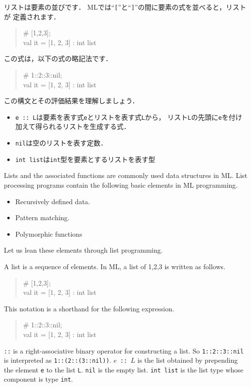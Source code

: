 \documentclass{jbook}
\begin{document}
リストは要素の並びです．
	MLでは``{\tt [}''と``{\tt ]}''の間に要素の式を並べると，リストが
定義されます．
\begin{tt}
\begin{quote}
\# [1,2,3];\\
val it = [1, 2, 3] : int list
\end{quote}
\end{tt}
	この式は，以下の式の略記法です．
\begin{tt}
\begin{quote}
\# 1::2::3::nil;\\
val it = [1, 2, 3] : int list
\end{quote}
\end{tt}
	この構文とその評価結果を理解しましょう．
\begin{itemize}
\item 
 {\tt e :: L}は要素を表す式{\tt e}とリストを表す式{\tt L}から，
リスト{\tt L}の先頭に{\tt e}を付け加えて得られるリストを生成する式．
\item 
{\tt nil}は空のリストを表す定数．
\item 
{\tt int list}は{\tt int}型を要素とするリストを表す型
\end{itemize}
\else%
	Lists and the associated functions are commonly used data
structures in ML.
	List processing programs contain the following basic elements in
ML programming.
\begin{itemize}
\item 
	Recursively defined data.
\item 
	Pattern matching.
\item 
	Polymorphic functions
\end{itemize}
	Let us lean these elements through list programming.

	A list is a sequence of elements.
	In ML, a list of 1,2,3 is written as follows.
\begin{tt}
\begin{quote}
\# [1,2,3];\\
val it = [1, 2, 3] : int list
\end{quote}
\end{tt}
	This notation is a shorthand for the following expression.
\begin{tt}
\begin{quote}
\# 1::2::3::nil;\\
val it = [1, 2, 3] : int list
\end{quote}
\end{tt}
	{\tt ::} is a right-associative binary operator for constructing
a list.
	So {\tt 1::2::3::nil} is interpreted as {\tt 1::(2::(3::nil))}.
	 {\tt $e$ :: $L$} is the list obtained by prepending the element {\tt e} to
the list {\tt L}.
	{\tt nil} is the empty list.
	{\tt int list} is the list type whose component is type {\tt int}.
\fi%
\end{document}
